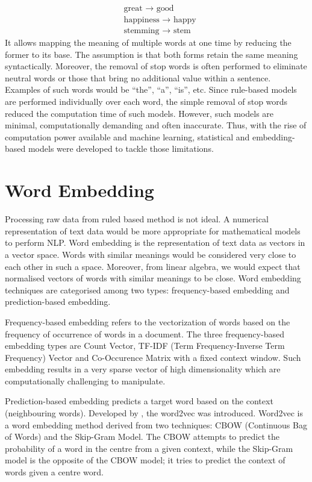 \begin{align*}
    &\text{great → good} \\
    &\text{happiness → happy} \\
    &\text{stemming → stem}
\end{align*}
It allows mapping the meaning of multiple words at one time by reducing the former to its base. The assumption is that both forms retain the same meaning syntactically. Moreover, the removal of stop words is often performed to eliminate neutral words or those that bring no additional value within a sentence. Examples of such words would be “the”, “a”, “is”, etc. Since rule-based models are performed individually over each word, the simple removal of stop words reduced the computation time of such models. However, such models are minimal, computationally demanding and often inaccurate. Thus, with the rise of computation power available and machine learning, statistical and embedding-based models were developed to tackle those limitations.
\section{Word Embedding}
Processing raw data from ruled based method is not ideal. A numerical representation of text data would be more appropriate for mathematical models to perform NLP. Word embedding is the representation of text data as vectors in a vector space. Words with similar meanings would be considered very close to each other in such a space. Moreover, from linear algebra, we would expect that normalised vectors of words with similar meanings to be close. Word embedding techniques are categorised among two types: frequency-based embedding and prediction-based embedding. 

Frequency-based embedding refers to the vectorization of words based on the frequency of occurrence of words in a document. The three frequency-based embedding types are Count Vector, TF-IDF (Term Frequency-Inverse Term Frequency) Vector and Co-Occurence Matrix with a fixed context window. Such embedding results in a very sparse vector of high dimensionality which are computationally challenging to manipulate. 

Prediction-based embedding predicts a target word based on the context (neighbouring words). Developed by \cite{Mikolov2013}, the word2vec was introduced. Word2vec is a word embedding method derived from two techniques: CBOW (Continuous Bag of Words) and the Skip-Gram Model. The CBOW attempts to predict the probability of a word in the centre from a given context, while the Skip-Gram model is the opposite of the CBOW model; it tries to predict the context of words given a centre word.
